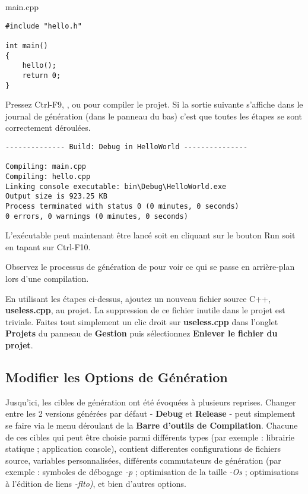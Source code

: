 main.cpp
\begin{lstlisting}
#include "hello.h"

int main()
{
    hello();
    return 0;
}
\end{lstlisting}

Pressez Ctrl-F9, , ou  pour compiler le projet. Si la sortie suivante s'affiche dans le journal de génération (dans le panneau du bas) c'est que toutes les étapes se sont correctement déroulées.

\begin{lstlisting}
-------------- Build: Debug in HelloWorld ---------------

Compiling: main.cpp
Compiling: hello.cpp
Linking console executable: bin\Debug\HelloWorld.exe
Output size is 923.25 KB
Process terminated with status 0 (0 minutes, 0 seconds)
0 errors, 0 warnings (0 minutes, 0 seconds)
\end{lstlisting}

L'exécutable peut maintenant être lancé soit en cliquant sur le bouton Run soit en tapant sur Ctrl-F10.


Observez le processus de génération de \codeblocks pour voir ce qui se passe en arrière-plan lors d'une compilation.


En utilisant les étapes ci-dessus, ajoutez un nouveau fichier source C++, \textbf{useless.cpp}, au projet. La suppression de ce fichier inutile dans le projet est triviale. Faites tout simplement un clic droit sur \textbf{useless.cpp} dans l'onglet \textbf{Projets} du panneau de \textbf{Gestion} puis sélectionnez \textbf{Enlever le fichier du projet}.

 


\subsection{Modifier les Options de Génération}
 
Jusqu'ici, les cibles de génération ont été évoquées à plusieurs reprises. Changer entre les 2 versions générées par défaut - \textbf{Debug} et \textbf{Release} - peut simplement se faire via le menu déroulant de la \textbf{Barre d'outils de Compilation}. Chacune de ces cibles qui peut être choisie parmi différents types (par exemple : librairie statique ; application console), contient differentes configurations de fichiers source, variables personnalisées, différents commutateurs de génération (par exemple : symboles de débogage \textit{-p} ; optimisation de la taille \textit{-Os} ; optimisations à l'édition de liens \textit{-flto)}, et bien d'autres options.
 
